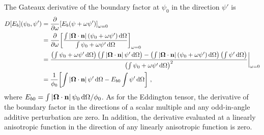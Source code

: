 \documentclass[../doc.tex]{subfiles}
\begin{document}
The Gateaux derivative of the boundary factor at $\psi_0$ in the direction $\psi'$ is 
	\begin{equation} \label{vef:Eb_deriv}
	\begin{aligned}
		D[E_b](\psi_0,\psi') &= \pderiv{}{\omega}\bracket{E_b(\psi + \omega\psi')}_{\omega=0} \\ 
		&= \pderiv{}{\omega}\bracket{\frac{\int |\Omegahat\cdot\n|\paren{\psi_0 + \omega\psi'} \ud \Omega}{\int \psi_0 + \omega\psi' \ud \Omega}}_{\omega=0} \\
		&= \frac{\paren{\int \psi_0 + \omega\psi' \ud \Omega}\paren{\int |\Omegahat\cdot\n|\,\psi'\ud\Omega} - \paren{\int |\Omegahat\cdot\n|\paren{\psi_0 + \omega\psi'}\ud\Omega}\paren{\int\psi'\ud\Omega}}{\paren{\int \psi_0 + \omega\psi' \ud \Omega}^2} \biggr\rvert_{\omega=0} \\
		&= \frac{1}{\phi_0}\bracket{\int |\Omegahat\cdot\n|\,\psi' \ud \Omega - E_{b0} \int \psi' \ud \Omega} \,,
	\end{aligned}
	\end{equation}
where $E_{b0} = \int |\boldsymbol{\Omega}\cdot\boldsymbol{\mathrm{n}}|\,\psi_0 \mathop{}\!\mathrm{d} \Omega/\phi_0$. As for the Eddington tensor, the derivative of the boundary factor in the directions of a scalar multiple and any odd-in-angle additive perturbation are zero. In addition, the derivative evaluated at a linearly anisotropic function in the direction of any linearly anisotropic function is zero. 
\end{document}
